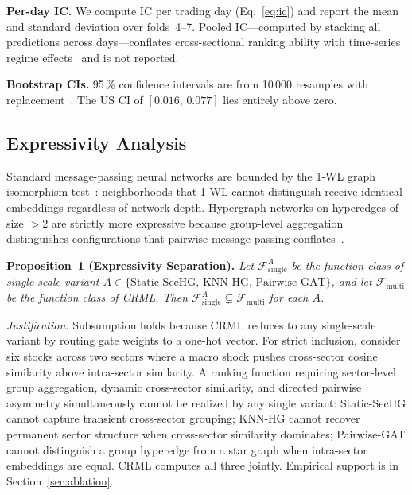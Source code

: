 \documentclass[journal]{IEEEtran}
\begin{document}
\textbf{Per-day IC.} We compute IC per trading day (Eq.~\ref{eq:ic})
and report the mean and standard deviation over folds~4--7. Pooled
IC---computed by stacking all predictions across days---conflates
cross-sectional ranking ability with time-series regime
effects~\cite{grinold2000active} and is not reported.

\textbf{Bootstrap CIs.} 95\,\% confidence intervals are from
10\,000 resamples with replacement~\cite{efron1994introduction}.
The US CI of $[0.016,\,0.077]$ lies entirely above zero.

\subsection{Expressivity Analysis}

Standard message-passing neural networks are bounded by the 1-WL graph
isomorphism test~\cite{xu2019how}: neighborhoods that 1-WL cannot
distinguish receive identical embeddings regardless of network depth.
Hypergraph networks on hyperedges of size $>2$ are strictly more
expressive because group-level aggregation distinguishes configurations
that pairwise message-passing conflates~\cite{feng2019hypergraph}.

\smallskip
\noindent\textbf{Proposition~1 (Expressivity Separation).}
\textit{Let $\mathcal{F}_{\mathrm{single}}^A$ be the function class of
single-scale variant
$A\in\{\mathrm{Static\text{-}SecHG},\,\mathrm{KNN\text{-}HG},\,
\mathrm{Pairwise\text{-}GAT}\}$, and let $\mathcal{F}_{\mathrm{multi}}$
be the function class of CRML. Then
$\mathcal{F}_{\mathrm{single}}^A\subsetneq\mathcal{F}_{\mathrm{multi}}$
for each $A$.}

\smallskip
\noindent\textit{Justification.} Subsumption holds because CRML reduces
to any single-scale variant by routing gate weights to a one-hot vector.
For strict inclusion, consider six stocks across two sectors where a
macro shock pushes cross-sector cosine similarity above intra-sector
similarity. A ranking function requiring sector-level group aggregation,
dynamic cross-sector similarity, and directed pairwise asymmetry
simultaneously cannot be realized by any single variant: Static-SecHG
cannot capture transient cross-sector grouping; KNN-HG cannot recover
permanent sector structure when cross-sector similarity dominates;
Pairwise-GAT cannot distinguish a group hyperedge from a star graph
when intra-sector embeddings are equal. CRML computes all three jointly.
Empirical support is in Section~\ref{sec:ablation}.
\end{document}
